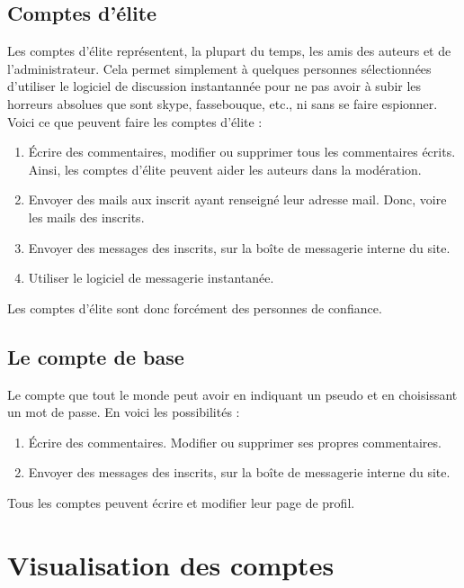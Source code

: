 \documentclass[french]{report}
\theoremstyle{plain}
\begin{document}
		\subsection{Comptes d'élite}
			Les comptes d'élite représentent, la plupart du temps, les amis des auteurs et de l'administrateur. Cela permet simplement à quelques personnes sélectionnées d'utiliser le logiciel de discussion instantannée pour ne pas avoir à subir les horreurs absolues que sont skype, fassebouque, etc., ni sans se faire espionner. Voici ce que peuvent faire les comptes d'élite :
			\begin{enumerate}
				\item Écrire des commentaires, modifier ou supprimer tous les commentaires écrits. Ainsi, les comptes d'élite peuvent aider les auteurs dans la modération. 
				\item Envoyer des mails aux inscrit ayant renseigné leur adresse mail. Donc, voire les mails des inscrits.
				\item Envoyer des messages des inscrits, sur la boîte de messagerie interne du site.
				\item Utiliser le logiciel de messagerie instantanée.
			\end{enumerate}
			Les comptes d'élite sont donc forcément des personnes de confiance.


		\subsection{Le compte de base}
			Le compte que tout le monde peut avoir en indiquant un pseudo et en choisissant un mot de passe. En voici les possibilités :
			\begin{enumerate}
				\item Écrire des commentaires. Modifier ou supprimer ses propres commentaires.
				\item Envoyer des messages des inscrits, sur la boîte de messagerie interne du site. 
			\end{enumerate}

		Tous les comptes peuvent écrire et modifier leur page de profil.


	\section{Visualisation des comptes}
\end{document}
